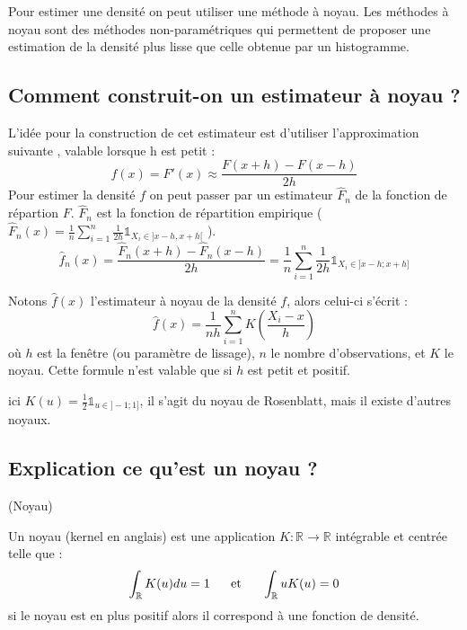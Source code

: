\documentclass[
]{book}
\begin{document}
Pour estimer une densité on peut utiliser une méthode à noyau.
Les méthodes à noyau sont des méthodes non-paramétriques qui permettent de proposer une estimation de la densité plus lisse que celle obtenue par un histogramme.

\hypertarget{comment-construit-on-un-estimateur-uxe0-noyau}{%
\subsection{Comment construit-on un estimateur à noyau ?}\label{comment-construit-on-un-estimateur-uxe0-noyau}}

L'idée pour la construction de cet estimateur est d'utiliser l'approximation suivante , valable lorsque h est petit :\\
\[
f(x) = F'(x)\approx \frac{F(x+h)-F(x-h)}{2h}
\]
Pour estimer la densité \(f\) on peut passer par un estimateur \(\hat F_n\) de la fonction de répartion \(F\). \(\hat F_n\) est la fonction de répartition empirique ( \(\hat F_n(x)= \frac1n \sum\limits_{i=1}^n\frac{1}{2h} \mathds1_{X_i \in ]x-h, x+h[}\) ).
\[
\hat f_n(x)= \frac{\hat F_n(x+h)-\hat F_n(x-h)}{2h} = \frac 1n \sum\limits_{i=1}^n \frac1{2h} \mathds1_{X_i \in ]x-h;x+h]}
\]

Notons \(\hat f(x)\) l'estimateur à noyau de la densité \(f\), alors celui-ci s'écrit :
\[
\hat f(x) = \frac1{nh} \sum\limits_{i=1}^n K\left(\frac{X_i-x}h\right)
\]
où \(h\) est la fenêtre (ou paramètre de lissage), \(n\) le nombre d'observations, et \(K\) le noyau.
Cette formule n'est valable que si \(h\) est petit et positif.

ici \(K(u)= \frac12 \mathds{1}_{u \in ]-1;1]}\), il s'agit du noyau de Rosenblatt, mais il existe d'autres noyaux.

\hypertarget{explication-ce-quest-un-noyau}{%
\subsection{Explication ce qu'est un noyau ?}\label{explication-ce-quest-un-noyau}}

\begin{dfn} (Noyau)  

Un noyau (kernel en anglais) est une application $K:\mathbb{R}\rightarrow\mathbb{R}$ intégrable et centrée telle que :
$$\int_{\mathbb R} K(u) du = 1 ~~~~ \hbox{ et } ~~~~ \int_{\mathbb R} u K(u)=0$$
si le noyau est en plus positif alors il correspond à une fonction de densité.
\end{dfn}
\end{document}
